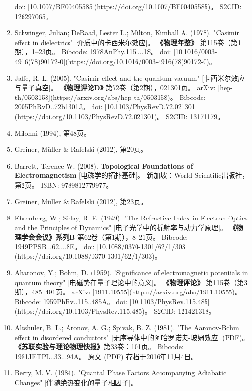 \begin{enumerate}
  doi: [10.1007/BF00405585](https://doi.org/10.1007/BF00405585)。  
  S2CID: 126297065。  
\item Schwinger, Julian; DeRaad, Lester L.; Milton, Kimball A. (1978). 
  "Casimir effect in dielectrics" [介质中的卡西米尔效应]。  
  \textbf{《物理年鉴》} 第115卷（第1期），1–23页。  
  Bibcode: 1978AnPhy.115....1S。  
  doi: [10.1016/0003-4916(78)90172-0](https://doi.org/10.1016/0003-4916(78)90172-0)。  
\item Jaffe, R. L. (2005).  
  "Casimir effect and the quantum vacuum" [卡西米尔效应与量子真空]。  
  \textbf{《物理评论D》} 第72卷（第2期），021301页。  
  arXiv: [hep-th/0503158](https://arxiv.org/abs/hep-th/0503158)。  
  Bibcode: 2005PhRvD..72b1301J。  
  doi: [10.1103/PhysRevD.72.021301](https://doi.org/10.1103/PhysRevD.72.021301)。  
  S2CID: 13171179。  
\item Milonni (1994), 第48页。  
\item Greiner, Müller & Rafelski (2012), 第20页。  
\item Barrett, Terence W. (2008).  
  \textbf{Topological Foundations of Electromagnetism} [电磁学的拓扑基础]。  
  新加坡：World Scientific出版社，第2页。  
  ISBN: 9789812779977。  
\item Greiner, Müller & Rafelski (2012), 第23页。 
\item Ehrenberg, W.; Siday, R. E. (1949). 
  "The Refractive Index in Electron Optics and the Principles of Dynamics" [电子光学中的折射率与动力学原理]。  
  \textbf{《物理学会会议》系列B} 第62卷（第1期），8–21页。  
  Bibcode: 1949PPSB...62....8E。  
  doi: [10.1088/0370-1301/62/1/303](https://doi.org/10.1088/0370-1301/62/1/303)。  
\item Aharonov, Y.; Bohm, D. (1959).  
  "Significance of electromagnetic potentials in quantum theory" [电磁势在量子理论中的意义]。  
  \textbf{《物理评论》} 第115卷（第3期），485–491页。  
  arXiv: [1911.10555](https://arxiv.org/abs/1911.10555)。  
  Bibcode: 1959PhRv..115..485A。  
  doi: [10.1103/PhysRev.115.485](https://doi.org/10.1103/PhysRev.115.485)。  
  S2CID: 121421318。  
\item Altshuler, B. L.; Aronov, A. G.; Spivak, B. Z. (1981).  
  "The Aaronov-Bohm effect in disordered conductors" [无序导体中的阿哈罗诺夫-玻姆效应] (PDF)。  
  \textbf{《苏联实验与理论物理快报》}第33卷：101页。  
  Bibcode: 1981JETPL..33...94A。  
  原文 (PDF) 存档于2016年11月4日。  
\item Berry, M. V. (1984).  
  "Quantal Phase Factors Accompanying Adiabatic Changes" [伴随绝热变化的量子相因子]。  

\end{enumerate}

